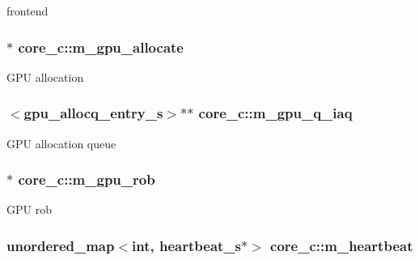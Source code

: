 \label{classcore__c_aef4ae847c7137fb984b2e2fa2e2d8128}
frontend \hypertarget{classcore__c_a954b769fe612af32cdb0ae5ecca77774}{
\subsubsection[{m\_\-gpu\_\-allocate}]{$\ast$ {\bf core\_\-c::m\_\-gpu\_\-allocate}}}
\label{classcore__c_a954b769fe612af32cdb0ae5ecca77774}
GPU allocation \hypertarget{classcore__c_a734b85a96e2063b1e950c7fd3cc7f70a}{
\subsubsection[{m\_\-gpu\_\-q\_\-iaq}]{$<${\bf gpu\_\-allocq\_\-entry\_\-s}$>$$\ast$$\ast$ {\bf core\_\-c::m\_\-gpu\_\-q\_\-iaq}}}
\label{classcore__c_a734b85a96e2063b1e950c7fd3cc7f70a}
GPU allocation queue \hypertarget{classcore__c_a821a374875ef6687d28537b2d79b4d8a}{
\subsubsection[{m\_\-gpu\_\-rob}]{$\ast$ {\bf core\_\-c::m\_\-gpu\_\-rob}}}
\label{classcore__c_a821a374875ef6687d28537b2d79b4d8a}
GPU rob \hypertarget{classcore__c_a2df8391575050b987e43bd1d4e3a3308}{
\subsubsection[{m\_\-heartbeat}]{\setlength{\rightskip}{0pt plus 5cm}unordered\_\-map$<$int, {\bf heartbeat\_\-s}$\ast$$>$ {\bf core\_\-c::m\_\-heartbeat}}}
